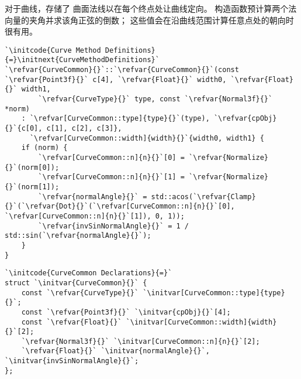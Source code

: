对于曲线，存储了
曲面法线以在每个终点处让曲线定向。
构造函数预计算两个法向量的夹角并求该角正弦的倒数；
这些值会在沿曲线范围计算任意点处的朝向时很有用。
\begin{lstlisting}
`\initcode{Curve Method Definitions}{=}\initnext{CurveMethodDefinitions}`
`\refvar{CurveCommon}{}`::`\refvar{CurveCommon}{}`(const `\refvar{Point3f}{}` c[4], `\refvar{Float}{}` width0, `\refvar{Float}{}` width1,
        `\refvar{CurveType}{}` type, const `\refvar{Normal3f}{}` *norm)
    : `\refvar[CurveCommon::type]{type}{}`(type), `\refvar{cpObj}{}`{c[0], c[1], c[2], c[3]},
      `\refvar[CurveCommon::width]{width}{}`{width0, width1} {
    if (norm) {
        `\refvar[CurveCommon::n]{n}{}`[0] = `\refvar{Normalize}{}`(norm[0]);
        `\refvar[CurveCommon::n]{n}{}`[1] = `\refvar{Normalize}{}`(norm[1]);
        `\refvar{normalAngle}{}` = std::acos(`\refvar{Clamp}{}`(`\refvar{Dot}{}`(`\refvar[CurveCommon::n]{n}{}`[0], `\refvar[CurveCommon::n]{n}{}`[1]), 0, 1));
        `\refvar{invSinNormalAngle}{}` = 1 / std::sin(`\refvar{normalAngle}{}`);
    }
}
\end{lstlisting}
\begin{lstlisting}
`\initcode{CurveCommon Declarations}{=}`
struct `\initvar{CurveCommon}{}` {
    const `\refvar{CurveType}{}` `\initvar[CurveCommon::type]{type}{}`;
    const `\refvar{Point3f}{}` `\initvar{cpObj}{}`[4];
    const `\refvar{Float}{}` `\initvar[CurveCommon::width]{width}{}`[2];
    `\refvar{Normal3f}{}` `\initvar[CurveCommon::n]{n}{}`[2];
    `\refvar{Float}{}` `\initvar{normalAngle}{}`, `\initvar{invSinNormalAngle}{}`;
};
\end{lstlisting}

